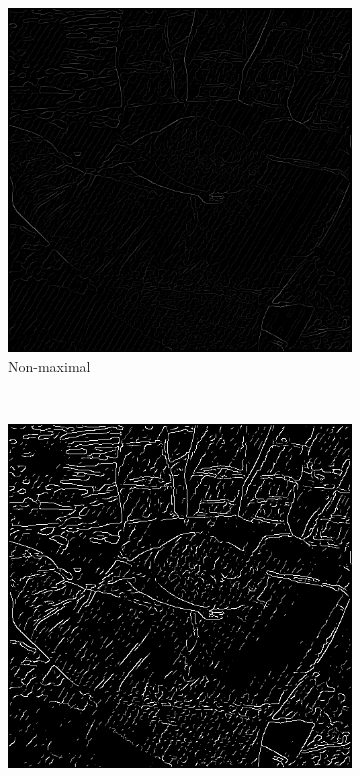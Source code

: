 \documentclass{article}
\begin{document}
\begin{enumerate}[label=(\alph*)]
\begin{figure}[!htb]
        \begin{subfigure}[b]{0.3\textwidth}
            \includegraphics[width=\textwidth]{img/GN(noise).png}
            \caption{Non-maximal}
        \end{subfigure}
        ~
        \begin{subfigure}[b]{0.3\textwidth}
            \includegraphics[width=\textwidth]{img/C(noise).png}

\end{subfigure}
\end{figure}
\end{enumerate}
\end{document}
